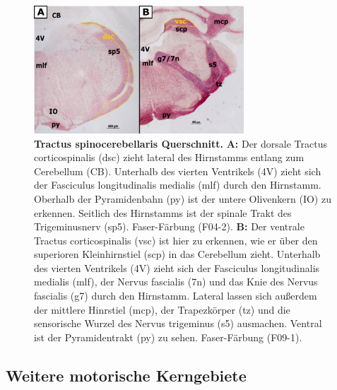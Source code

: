 \documentclass[12pt,a4paper,pdftex]{article}
\begin{document}
\begin{figure}[H]
    \centering
    \includegraphics[width=0.7\textwidth]{pictures/Bilder_Laura/spinocerebellar_tract_F04_2P_025x_F09_1P_025x.png}
    \caption[Tractus spinocerebellaris Querschnitt]{\textbf{Tractus spinocerebellaris Querschnitt.} \textbf{A:} Der dorsale Tractus corticospinalis (dsc) zieht lateral des Hirnstamms entlang zum Cerebellum (CB). Unterhalb des vierten Ventrikels (4V) zieht sich der Fasciculus longitudinalis medialis (mlf) durch den Hirnstamm. Oberhalb der Pyramidenbahn (py) ist der untere Olivenkern (IO) zu erkennen. Seitlich des Hirnstamms ist der spinale Trakt des Trigeminusnerv (sp5). Faser-Färbung (F04-2). \textbf{B:} Der ventrale Tractus corticospinalis (vsc) ist hier zu erkennen, wie er über den superioren Kleinhirnstiel (scp) in das Cerebellum zieht.  Unterhalb des vierten Ventrikels (4V) zieht sich der Fasciculus longitudinalis medialis (mlf), der Nervus fascialis (7n) und das Knie des Nervus fascialis (g7) durch den Hirnstamm. Lateral lassen sich außerdem der mittlere Hinrstiel (mcp), der Trapezkörper (tz) und die sensorische Wurzel des Nervus trigeminus (s5) ausmachen. Ventral ist der Pyramidentrakt (py) zu sehen. Faser-Färbung (F09-1).}
    \label{fig:spinocerebellar}
\end{figure}

\subsection{Weitere motorische Kerngebiete}
\end{document}
